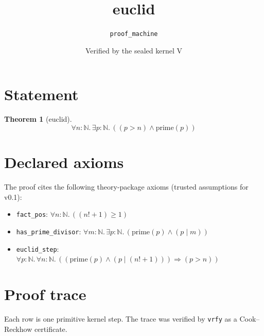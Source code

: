 \documentclass[11pt]{article}
\title{euclid}
\author{\texttt{proof\_machine}}
\date{Verified by the sealed kernel V}
\newtheorem{theorem}{Theorem}
\begin{document}
\maketitle
\section*{Statement}
\begin{theorem}[euclid]
$$\forall n\!:\!\mathbb{N}.\, \exists p\!:\!\mathbb{N}.\, ((p > n) \wedge \mathrm{prime}(p))$$
\end{theorem}

\section*{Declared axioms}
The proof cites the following theory-package axioms (trusted assumptions for v0.1):
\begin{itemize}
  \item \texttt{fact\_pos}: $\forall n\!:\!\mathbb{N}.\, ((n! + 1) \geq 1)$
  \item \texttt{has\_prime\_divisor}: $\forall m\!:\!\mathbb{N}.\, \exists p\!:\!\mathbb{N}.\, (\mathrm{prime}(p) \wedge (p \mid m))$
  \item \texttt{euclid\_step}: $\forall p\!:\!\mathbb{N}.\, \forall n\!:\!\mathbb{N}.\, ((\mathrm{prime}(p) \wedge (p \mid (n! + 1))) \Rightarrow (p > n))$
\end{itemize}

\section*{Proof trace}
Each row is one primitive kernel step. The trace was verified by \texttt{vrfy} as a Cook--Reckhow certificate.
\end{document}
